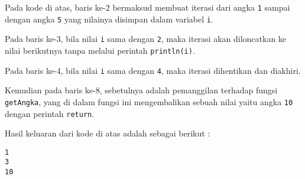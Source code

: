 Pada kode di atas, baris ke-2 bermaksud membuat iterasi dari angka \texttt{1} sampai dengan angka \texttt{5} yang nilainya disimpan dalam variabel \texttt{i}.

Pada baris ke-3, bila nilai \texttt{i} sama dengan \texttt{2}, maka iterasi akan diloncatkan ke nilai berikutnya tanpa melalui perintah \texttt{println(i)}.

Pada baris ke-4, bila nilai \texttt{i} sama dengan \texttt{4}, maka iterasi dihentikan dan diakhiri.

Kemudian pada baris ke-8, sebetulnya adalah pemanggilan terhadap fungsi \texttt{getAngka}, yang di dalam fungsi ini mengembalikan sebuah nilai yaitu angka \texttt{10} dengan perintah \texttt{return}.

Hasil keluaran dari kode di atas adalah sebagai berikut :

\begin{lstlisting}
1
3
10
\end{lstlisting}
